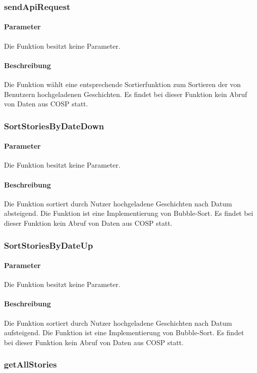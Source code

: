\subsubsection{sendApiRequest}
\paragraph{Parameter} Die Funktion besitzt keine Parameter.
\paragraph{Beschreibung} Die Funktion wählt eine entsprechende Sortierfunktion zum Sortieren der von Benutzern hochgeladenen Geschichten. Es findet bei dieser Funktion kein Abruf von Daten aus {\glqq COSP\grqq} statt.
\subsubsection{SortStoriesByDateDown}
\paragraph{Parameter} Die Funktion besitzt keine Parameter.
\paragraph{Beschreibung} Die Funktion sortiert durch Nutzer hochgeladene Geschichten nach Datum absteigend. Die Funktion ist eine Implementierung von Bubble-Sort. Es findet bei dieser Funktion kein Abruf von Daten aus {\glqq COSP\grqq} statt.
\subsubsection{SortStoriesByDateUp}
\paragraph{Parameter} Die Funktion besitzt keine Parameter.
\paragraph{Beschreibung} Die Funktion sortiert durch Nutzer hochgeladene Geschichten nach Datum aufsteigend. Die Funktion ist eine Implementierung von Bubble-Sort. Es findet bei dieser Funktion kein Abruf von Daten aus {\glqq COSP\grqq} statt.
\subsubsection{getAllStories}
